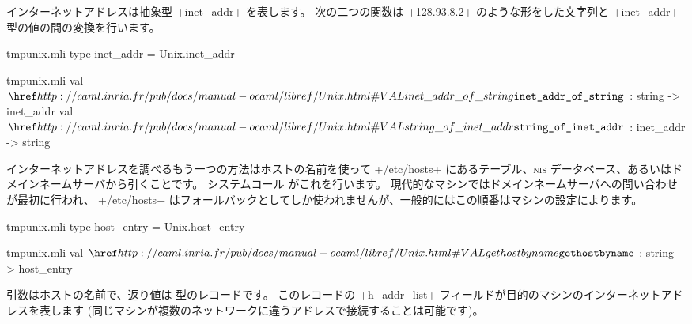 インターネットアドレスは抽象型 \ml+inet_addr+ を表します。
次の二つの関数は \ml+128.93.8.2+ のような形をした文字列と \ml+inet_addr+ 型の値の間の変換を行います。
%
\begin{codefile}{tmpunix.mli}
type inet_addr = Unix.inet_addr
\end{codefile}
%
\begin{listingcodefile}{tmpunix.mli}
val $\indexlibvalue{Unix}{inet\_addr\_of\_string}$ : string -> inet_addr
val $\indexlibvalue{Unix}{string\_of\_inet\_addr}$ : inet_addr -> string
\end{listingcodefile}
%

インターネットアドレスを調べるもう一つの方法はホストの名前を使って
\ml+/etc/hosts+ にあるテーブル、\textsc{nis} データベース、あるいはドメインネームサーバから引くことです。
システムコール  がこれを行います。
現代的なマシンではドメインネームサーバへの問い合わせが最初に行われ、
\ml+/etc/hosts+ はフォールバックとしてしか使われませんが、一般的にはこの順番はマシンの設定によります。
%
\begin{codefile}{tmpunix.mli}
type host_entry = Unix.host_entry
\end{codefile}
%
\begin{listingcodefile}{tmpunix.mli}
val $\libvalue{Unix}{gethostbyname}$ : string -> host_entry
\end{listingcodefile}
%
引数はホストの名前で、返り値は  型のレコードです。
このレコードの \ml+h_addr_list+ フィールドが目的のマシンのインターネットアドレスを表します
(同じマシンが複数のネットワークに違うアドレスで接続することは可能です)。

